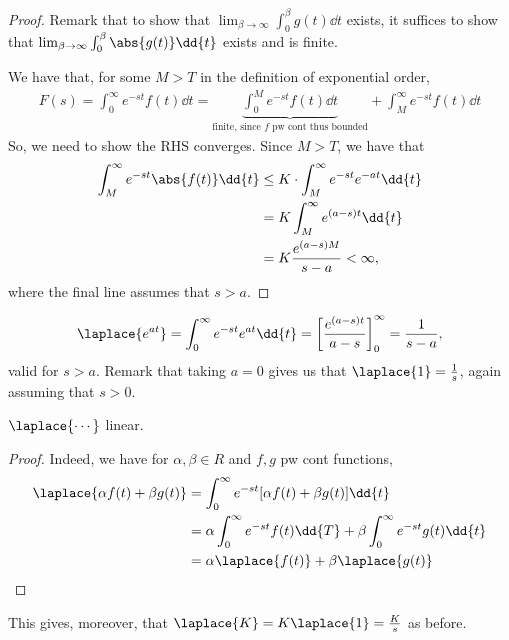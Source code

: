 \begin{proof}
    Remark that to show that $\lim_{\beta \to \infty} \int_0^\beta g(t) \dd{t}$ exists, it suffices to show that $\lim_{\beta \to \infty} \int_0^\beta \abs{g(t)} \dd{t}$ exists and is finite.
    
    We have that, for some $M > T$ in the definition of exponential order, \begin{align*}
        F(s) = \int_0^\infty e^{-st}f(t) \dd{t} = \underbrace{\int_0^M e^{-st} f(t) \dd{t}}_{\text{finite, since $f$ pw cont thus bounded}} + \int_M^\infty e^{-st} f(t) \dd{t}
    \end{align*}
    So, we need to show the RHS converges. Since $M > T$, we have that \begin{align*}
        \int_M^\infty e^{-st} \abs{f(t)} \dd{t} &\leq K \cdot \int_M^\infty e^{-st}e^{-at}\dd{t}\\
        &= K \int_M^\infty e^{(a-s)t} \dd{t}\\
        &= K \frac{e^{(a-s)M}}{s - a} < \infty,
    \end{align*}
    where the final line assumes that $s > a$.
\end{proof}

\begin{example}
    \begin{align*}
        \laplace{e^{at}} = \int_0^\infty e^{-st} e^{at} \dd{t} = \left[\frac{e^{(a-s)t}}{a-s}\right]_0^\infty = \frac{1}{s - a},
    \end{align*}
    valid for $s > a$. Remark that taking $a = 0$ gives us that $\laplace{1} = \frac{1}{s}$, again assuming that $s > 0$.
\end{example}

\begin{proposition}
    $\laplace{\cdots}$ linear.
\end{proposition}
\begin{proof}
    Indeed, we have for $\alpha, \beta \in R$ and $f, g$ pw cont functions, \begin{align*}
        \laplace{\alpha f(t) + \beta g(t)} &= \int_0^\infty e^{-st} [\alpha f(t) + \beta g(t)] \dd{t}\\
        &= \alpha \int_0^\infty e^{-st} f(t) \dd{T} + \beta\int_0^\infty e^{-st} g(t) \dd{t}\\
        &= \alpha \laplace{f(t)} + \beta \laplace{g(t)}
    \end{align*}
\end{proof}

\begin{remark}
    This gives, moreover, that $\laplace{K} = K \laplace{1} = \frac{K}{s}$ as before.
\end{remark}

